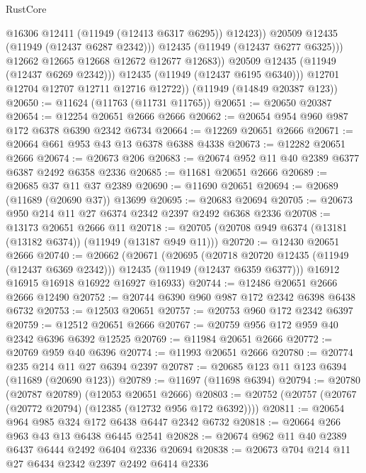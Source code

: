 \begin{lexlean}{RustCore}
\begin{coremodule}
                        @16306
                        @12411
                        (@11949 (@12413 @6317 @6295))
                        @12423))
                    @20509
                    @12435
                    (@11949 (@12437 @6287 @2342)))
                  @12435
                  (@11949 (@12437 @6277 @6325)))
                @12662
                @12665
                @12668
                @12672
                @12677
                @12683))
            @20509
            @12435
            (@11949 (@12437 @6269 @2342)))
          @12435
          (@11949 (@12437 @6195 @6340)))
        @12701
        @12704
        @12707
        @12711
        @12716
        @12722))
    (@11949 (@14849 @20387 @123))
@20650 := @11624 (@11763 (@11731 @11765))
@20651 := @20650 @20387
@20654 := @12254 @20651 @2666 @2666
@20662 := @20654 @954 @960 @987 @172 @6378 @6390 @2342 @6734
@20664 := @12269 @20651 @2666
@20671 := @20664 @661 @953 @43 @13 @6378 @6388 @4338
@20673 := @12282 @20651 @2666
@20674 := @20673 @206
@20683 := @20674 @952 @11 @40 @2389 @6377 @6387 @2492 @6358 @2336
@20685 := @11681 @20651 @2666
@20689 := @20685 @37 @11 @37 @2389
@20690 := @11690 @20651
@20694 := @20689 (@11689 (@20690 @37)) @13699
@20695 := @20683 @20694
@20705 := @20673 @950 @214 @11 @27 @6374 @2342 @2397 @2492 @6368 @2336
@20708 := @13173 @20651 @2666 @11
@20718 := @20705 (@20708 @949 @6374 (@13181 (@13182 @6374)) (@11949 (@13187 @949 @11)))
@20720 := @12430 @20651 @2666
@20740 := @20662
    (@20671
      (@20695
        (@20718 @20720 @12435 (@11949 (@12437 @6369 @2342)))
        @12435
        (@11949 (@12437 @6359 @6377)))
      @16912
      @16915
      @16918
      @16922
      @16927
      @16933)
@20744 := @12486 @20651 @2666 @2666 @12490
@20752 := @20744 @6390 @960 @987 @172 @2342 @6398 @6438 @6732
@20753 := @12503 @20651
@20757 := @20753 @960 @172 @2342 @6397
@20759 := @12512 @20651 @2666
@20767 := @20759 @956 @172 @959 @40 @2342 @6396 @6392 @12525
@20769 := @11984 @20651 @2666
@20772 := @20769 @959 @40 @6396
@20774 := @11993 @20651 @2666
@20780 := @20774 @235 @214 @11 @27 @6394 @2397
@20787 := @20685 @123 @11 @123 @6394 (@11689 (@20690 @123))
@20789 := @11697 (@11698 @6394)
@20794 := @20780 (@20787 @20789) (@12053 @20651 @2666)
@20803 := @20752 (@20757 (@20767 (@20772 @20794) (@12385 (@12732 @956 @172 @6392))))
@20811 := @20654 @964 @985 @324 @172 @6438 @6447 @2342 @6732
@20818 := @20664 @266 @963 @43 @13 @6438 @6445 @2541
@20828 := @20674 @962 @11 @40 @2389 @6437 @6444 @2492 @6404 @2336 @20694
@20838 := @20673 @704 @214 @11 @27 @6434 @2342 @2397 @2492 @6414 @2336

\end{coremodule}
\end{lexlean}
